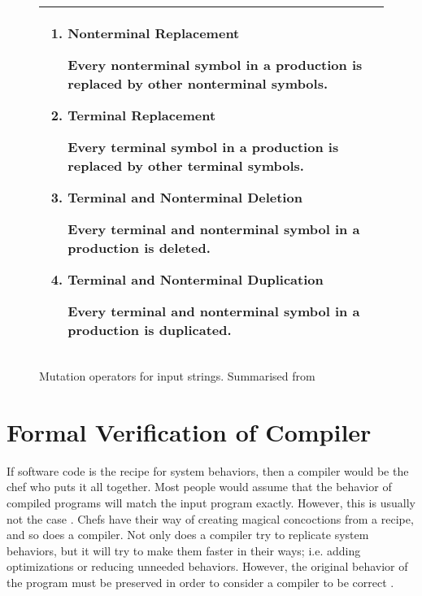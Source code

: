 \begin{figure}[h]
    \begin{tabular}{|L{0.95\textwidth}|}
        \hline
        \begin{enumerate}
            \item \textbf{Nonterminal Replacement}
            
            Every nonterminal symbol in a production is replaced by other nonterminal symbols.
    
            \item \textbf{Terminal Replacement}
            
            Every terminal symbol in a production is replaced by other terminal symbols.
    
            \item \textbf{Terminal and Nonterminal Deletion}
            
            Every terminal and nonterminal symbol in a production is deleted.
    
            \item \textbf{Terminal and Nonterminal Duplication}
            
            Every terminal and nonterminal symbol in a production is duplicated.
        \end{enumerate} \\
        \hline
    \end{tabular}

    \caption{Mutation operators for input strings. Summarised from \cite[Sec. 6.2]{offutt_mutation_2006}}
    \label{fig:MutationOperators}
\end{figure}

\section{Formal Verification of Compiler}
\label{sec:verification}

If software code is the recipe for system behaviors, then a compiler would be the chef who puts it all together. Most people would assume that 
the behavior of compiled programs will match the input program exactly. However, this is usually not the case \cite{compcertVerification}. 
Chefs have their way of creating magical concoctions from a recipe, and so does a compiler. Not only does a compiler try to replicate 
system behaviors, but it will try to make them faster in their ways; i.e. adding optimizations or reducing unneeded behaviors. However, the 
original behavior of the program must be preserved in order to consider a compiler to be correct 
\cite{compcertVerification,AliveInLean,Alive2,Term_Graph_Optimizations}.

